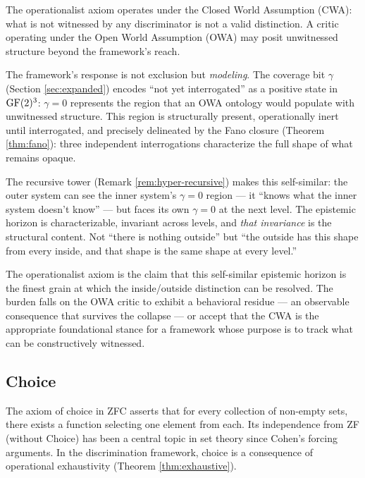 \begin{remark}
\label{rem:cwa-owa}
The operationalist axiom operates under the Closed World
Assumption (CWA): what is not witnessed by any discriminator
is not a valid distinction. A critic operating under the
Open World Assumption (OWA) may posit unwitnessed structure
beyond the framework's reach.

The framework's response is not exclusion but
\emph{modeling}. The coverage bit $\gamma$
(Section \ref{sec:expanded}) encodes ``not yet
interrogated'' as a positive state in $\operatorname{GF}(2)^3$:
$\gamma = 0$ represents the region that an OWA ontology
would populate with unwitnessed structure. This region is
structurally present, operationally inert until
interrogated, and precisely delineated by the Fano closure
(Theorem \ref{thm:fano}): three independent interrogations
characterize the full shape of what remains opaque.

The recursive tower (Remark \ref{rem:hyper-recursive})
makes this self-similar: the outer system can see the
inner system's $\gamma = 0$ region --- it ``knows what the
inner system doesn't know'' --- but faces its own
$\gamma = 0$ at the next level. The epistemic horizon is
characterizable, invariant across levels, and \emph{that
invariance} is the structural content. Not ``there is
nothing outside'' but ``the outside has this shape from
every inside, and that shape is the same shape at every
level.''

The operationalist axiom is the claim that this
self-similar epistemic horizon is the finest grain at
which the inside/outside distinction can be resolved.
The burden falls on the OWA critic to exhibit a behavioral
residue --- an observable consequence that survives the
collapse --- or accept that the CWA is the appropriate
foundational stance for a framework whose purpose is to
track what can be constructively witnessed.
\end{remark}

\subsection{Choice}\label{sec:choice}

The axiom of choice in ZFC asserts that for every collection
of non-empty sets, there exists a function selecting one
element from each. Its independence from ZF (without Choice)
has been a central topic in set theory since Cohen's forcing
arguments. In the discrimination framework, choice is a
consequence of operational exhaustivity (Theorem
\ref{thm:exhaustive}).


